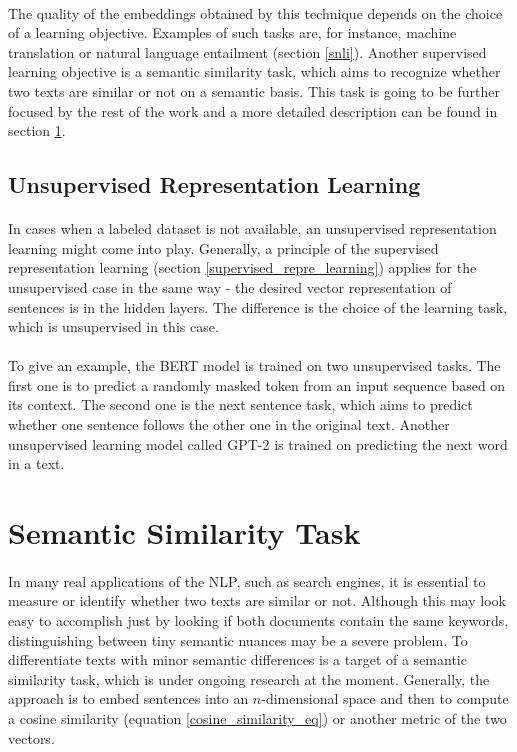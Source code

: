 \paragraph{}
The quality of the embeddings obtained by this technique depends on the choice of a learning objective. Examples of such tasks are, for instance, machine translation or natural language entailment (section \ref{snli}). Another supervised learning objective is a semantic similarity task, which aims to recognize whether two texts are similar or not on a semantic basis. This task is going to be further focused by the rest of the work and a more detailed description can be found in section \ref{semantic_similarity_tasks}.

\subsection{Unsupervised Representation Learning}
\paragraph{}
In cases when a labeled dataset is not available, an unsupervised representation learning might come into play. Generally, a principle of the supervised representation learning (section \ref{supervised_repre_learning}) applies for the unsupervised case in the same way - the desired vector representation of sentences is in the hidden layers. The difference is the choice of the learning task, which is unsupervised in this case. 

\paragraph{}
To give an example, the BERT model \cite{bert} is trained on two unsupervised tasks. The first one is to predict a randomly masked token from an input sequence based on its context. The second one is the next sentence task, which aims to predict whether one sentence follows the other one in the original text. Another unsupervised learning model called GPT-2 \cite{GPT2} is trained on predicting the next word in a text.

\section{Semantic Similarity Task}\label{semantic_similarity_tasks}
\paragraph{}
In many real applications of the NLP, such as search engines, it is essential to measure or identify whether two texts are similar or not. Although this may look easy to accomplish just by looking if both documents contain the same keywords, distinguishing between tiny semantic nuances may be a severe problem. To differentiate texts with minor semantic differences is a target of a semantic similarity task, which is under ongoing research at the moment. Generally, the approach is to embed sentences into an $n$-dimensional space and then to compute a cosine similarity (equation \ref{cosine_similarity_eq}) or another metric of the two vectors. 

